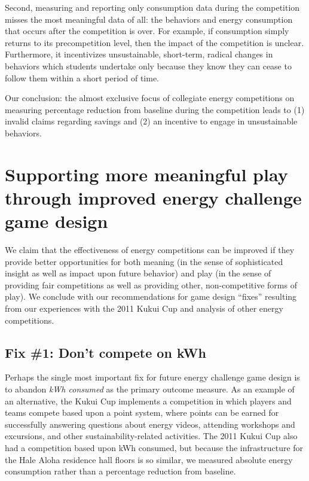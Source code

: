 \documentclass[jou]{apa} %
\begin{document}
Second, measuring and reporting only consumption data during the competition misses the
most meaningful data of all: the behaviors and energy consumption that occurs after the
competition is over. For example, if consumption simply returns to its precompetition
level, then the impact of the competition is unclear. Furthermore, it incentivizes
unsustainable, short-term, radical changes in behaviors which students undertake only
because they know they can cease to follow them within a short period of time.

Our conclusion: the almost exclusive focus of collegiate energy competitions on measuring
percentage reduction from baseline during the competition leads to (1) invalid claims
regarding savings and (2) an incentive to engage in unsustainable behaviors.

\section{Supporting more meaningful play through improved energy challenge game design}

We claim that the effectiveness of energy competitions can be improved if they provide
better opportunities for both meaning (in the sense of sophisticated insight as well as
impact upon future behavior) and play (in the sense of providing fair competitions as well
as providing other, non-competitive forms of play). We conclude with our recommendations
for game design ``fixes'' resulting from our experiences with the 2011 Kukui Cup and
analysis of other energy competitions.

\subsection{Fix \#1: Don't compete on kWh}

Perhaps the single most important fix for future energy challenge game design is to
abandon {\em kWh consumed} as the primary outcome measure.  As an example of an 
alternative, the Kukui Cup implements a competition in which players and teams compete
based upon a point system, where points can be earned for successfully answering questions
about energy videos, attending workshops and excursions, and other sustainability-related
activities.  The 2011 Kukui Cup also had a competition based upon kWh consumed, but
because the infrastructure for the Hale Aloha residence hall floors is so similar, we
measured absolute energy consumption rather than a percentage reduction from baseline.
\end{document}
